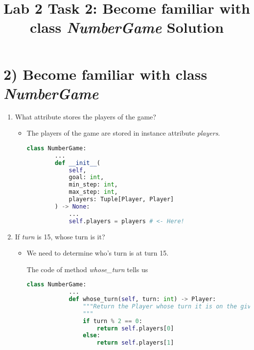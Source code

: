 \documentclass[12pt]{article}
\begin{document}
\title{Lab 2 Task 2: Become familiar with class \textit{NumberGame} Solution}
\date{}
\maketitle

\section*{2) Become familiar with class \textit{NumberGame}}
\begin{enumerate}[1.]
    \item What attribute stores the players of the game?

    \begin{itemize}
    \item The players of the game are stored in instance attribute \textit{players}.

    \begin{lstlisting}[language=Python]
    class NumberGame:
        ...
        def __init__(
            self,
            goal: int,
            min_step: int,
            max_step: int,
            players: Tuple[Player, Player]
        ) -> None:
            ...
            self.players = players # <- Here!
    \end{lstlisting}
    \end{itemize}

    \item If \textit{turn} is 15, whose turn is it?

    \bigskip

    \begin{itemize}
        \item

        We need to determine who's turn is at turn 15.

        \bigskip

        The code of method \textit{whose\_turn} tells us

        \bigskip

        \begin{lstlisting}[language=Python]
        class NumberGame:
            ...
            def whose_turn(self, turn: int) -> Player:
                """Return the Player whose turn it is on the given turn number.
                """
                if turn % 2 == 0:
                    return self.players[0]
                else:
                    return self.players[1]
        \end{lstlisting}


\end{itemize}
\end{enumerate}
\end{document}
